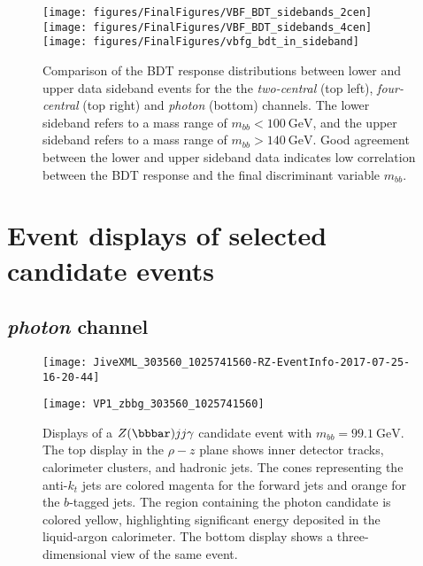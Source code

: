 \documentclass[PAPER, american,coverpage,texlive=2016, english]{\ATLASLATEXPATH atlasdoc}
\providecommand{\DIFadd}[1]{{\protect\color{blue}\uwave{#1}}} %
\providecommand{\DIFdel}[1]{{\protect\color{red}\sout{#1}}}                      %
\providecommand{\DIFaddFL}[1]{\DIFadd{#1}} %
\providecommand{\DIFdelFL}[1]{\DIFdel{#1}} %
\providecommand{\DIFaddbeginFL}{} %
\providecommand{\DIFaddendFL}{} %
\providecommand{\DIFdelbeginFL}{} %
\providecommand{\DIFdelendFL}{} %
\begin{document}
\begin{figure}[htbp]
  \centering
  \DIFdelbeginFL %
\DIFdelendFL \DIFaddbeginFL \texttt{[image: figures/FinalFigures/VBF\_BDT\_sidebands\_2cen]}
  \texttt{[image: figures/FinalFigures/VBF\_BDT\_sidebands\_4cen]}
  \texttt{[image: figures/FinalFigures/vbfg\_bdt\_in\_sideband]}
  \DIFaddendFL \caption{Comparison of the BDT response distributions between lower and upper data sideband events for the the \textit{two-central} (top left), \textit{four-central} (top right)  and \textit{photon} (bottom) channels. The lower sideband refers to a mass range of $m_{bb}<\SI{100}{\GeV}$, and the upper sideband refers to a mass range of $m_{bb}>\SI{140}{\GeV}$. 
	 Good agreement between the lower and upper sideband data indicates low correlation between the BDT response and the final discriminant variable $m_{bb}$.
  }
\end{figure}

\clearpage

\section{Event displays of selected candidate events}

\subsection{\textit{photon} channel}

\begin{figure}[htbp]
\centering
\texttt{[image: JiveXML\_303560\_1025741560-RZ-EventInfo-2017-07-25-16-20-44]}

\texttt{[image: VP1\_zbbg\_303560\_1025741560]}
\caption{Displays of a $Z(\bbbar)jj\gamma$ candidate event with \DIFdelbeginFL \DIFdelFL{$m_{bb}=\SI{99.1}{\GeV}$}\DIFdelendFL \DIFaddbeginFL \DIFaddFL{$m_{bb}=\SI{99}{\GeV}$}\DIFaddendFL .  The top display in the $\rho-z$ plane shows inner detector tracks, calorimeter clusters, and hadronic jets.  The cones representing the anti-$k_t$ jets are colored magenta for the forward jets and orange for the $b$-tagged jets.  The region containing the photon candidate is colored yellow, highlighting significant energy deposited in the liquid-argon calorimeter. The bottom display shows a three-dimensional view of the same event.}
\label{fig:event_displays_photon_91}
\end{figure}
\end{document}
